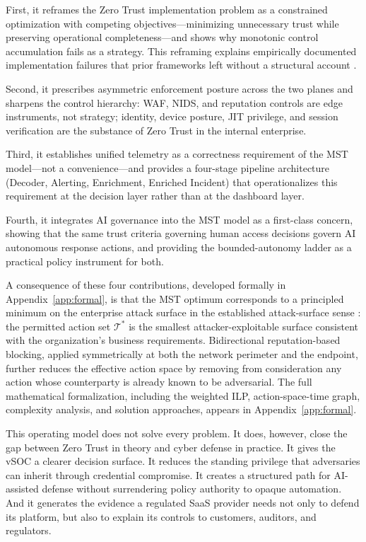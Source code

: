 \documentclass[unnumsec,webpdf,contemporary,large]{oup-authoring-template}
\theoremstyle{thmstyleone}
\theoremstyle{thmstyletwo}
\theoremstyle{thmstylethree}
\begin{document}
First, it reframes the Zero Trust implementation problem as a constrained optimization
with competing objectives---minimizing unnecessary trust while preserving operational
completeness---and shows why monotonic control accumulation fails as a strategy.
This reframing explains empirically documented implementation failures that prior
frameworks left without a structural account \cite{buck2021}.

Second, it prescribes asymmetric enforcement posture across the two planes and
sharpens the control hierarchy: WAF, NIDS, and reputation controls are edge
instruments, not strategy; identity, device posture, JIT privilege, and session
verification are the substance of Zero Trust in the internal enterprise.

Third, it establishes unified telemetry as a correctness requirement of the MST
model---not a convenience---and provides a four-stage pipeline architecture
(Decoder, Alerting, Enrichment, Enriched Incident) that operationalizes this
requirement at the decision layer rather than at the dashboard layer.

Fourth, it integrates AI governance into the MST model as a first-class concern,
showing that the same trust criteria governing human access decisions govern AI
autonomous response actions, and providing the bounded-autonomy ladder as a
practical policy instrument for both.

A consequence of these four contributions, developed formally in
Appendix~\ref{app:formal}, is that the MST optimum corresponds to a principled
minimum on the enterprise attack surface in the established attack-surface sense \cite{manadhata2011}: the permitted action set $\mathcal{T}^{*}$ is the smallest
attacker-exploitable surface consistent with the organization's business requirements.
Bidirectional reputation-based blocking, applied symmetrically at both the network
perimeter and the endpoint, further reduces the effective action space by removing
from consideration any action whose counterparty is already known to be adversarial.
The full mathematical formalization, including the weighted ILP, action-space-time
graph, complexity analysis, and solution approaches, appears in
Appendix~\ref{app:formal}.

This operating model does not solve every problem. It does, however, close the gap between
Zero Trust in theory and cyber defense in practice. It gives the vSOC a clearer decision
surface. It reduces the standing privilege that adversaries can inherit through credential
compromise. It creates a structured path for AI-assisted defense without surrendering policy
authority to opaque automation. And it generates the evidence a regulated SaaS provider
needs not only to defend its platform, but also to explain its controls to customers,
auditors, and regulators.
\end{document}
